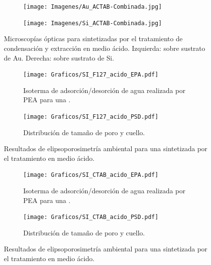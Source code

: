    			\begin{figure}
 	   	    \begin{subfigure}{0.49\textwidth}
	       	\texttt{[image: Imagenes/Au\_ACTAB-Combinada.jpg]}
	   		\end{subfigure}
	   		\begin{subfigure}{0.49\textwidth}
	   	    \texttt{[image: Imagenes/Si\_ACTAB-Combinada.jpg]}
	   		\end{subfigure}
			 \caption[Microscopía óptica \pdmC tratamiento en medio ácido.]{Microscopías ópticas para \pdmC\space sintetizadas por el tratamiento de condensación y extracción en medio ácido. Izquierda: sobre sustrato de Au. Derecha: sobre sustrato de Si.}
			 \label{fig:Microscopia_CTAB_acido}	
		     \end{figure}
   	

		    \begin{figure}
		  	\begin{subfigure}{0.495\textwidth}
		  	\texttt{[image: Graficos/SI\_F127\_acido\_EPA.pdf]}
			\caption{Isoterma de adsorción/desorción de agua realizada por PEA para una \pdmF.}
			\label{fig:F127_acido_EPA}
			\end{subfigure}
			\begin{subfigure}{0.495\textwidth}
		  	\texttt{[image: Graficos/SI\_F127\_acido\_PSD.pdf]}
			\caption{Distribución de tamaño de poro y cuello.\\ }
			\label{fig:F127_acido_PSD}
			\end{subfigure}
			\caption[Elipsoporosimetría \pdmF\space tratamiento ácido.]{Resultados de elipsoporosimetría ambiental para una \pdmF\space sintetizada por el tratamiento en medio ácido.}
			\end{figure}     

		
			\begin{figure}
		  	\begin{subfigure}{0.495\textwidth}
		  	\texttt{[image: Graficos/SI\_CTAB\_acido\_EPA.pdf]}
			\caption[Elipsoporsimetría \pdmC\space tratamiento ácido.]{Isoterma de adsorción/desorción de agua realizada por PEA para una \pdmC.}
			\label{fig:CTAB_acido_EPA}
			\end{subfigure}
			\begin{subfigure}{0.495\textwidth}
		  	\texttt{[image: Graficos/SI\_CTAB\_acido\_PSD.pdf]}
			\caption{Distribución de tamaño de poro y cuello.\\ }
			\label{fig:CTAB_acido_PSD}
			\end{subfigure}
			\caption[Elipsoporosimetría \pdmC\space tratamiento ácido.]{Resultados de elipsoporosimetría ambiental para una \pdmC\space sintetizada por el tratamiento en medio ácido.}
			\end{figure}

